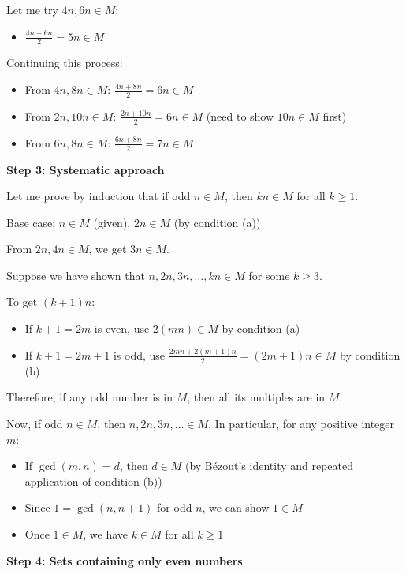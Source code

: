 \documentclass[12pt,a4paper]{article}
\theoremstyle{definition}
\begin{document}
    Let me try $4n, 6n \in M$:
    \begin{itemize}
        \item $\frac{4n + 6n}{2} = 5n \in M$
    \end{itemize}

    Continuing this process:
    \begin{itemize}
        \item From $4n, 8n \in M$: $\frac{4n + 8n}{2} = 6n \in M$
        \item From $2n, 10n \in M$: $\frac{2n + 10n}{2} = 6n \in M$ (need to show $10n \in M$ first)
        \item From $6n, 8n \in M$: $\frac{6n + 8n}{2} = 7n \in M$
    \end{itemize}

    \textbf{Step 3: Systematic approach}

    Let me prove by induction that if odd $n \in M$, then $kn \in M$ for all $k \geq 1$.

    Base case: $n \in M$ (given), $2n \in M$ (by condition (a))

    From $2n, 4n \in M$, we get $3n \in M$.

    Suppose we have shown that $n, 2n, 3n, \ldots, kn \in M$ for some $k \geq 3$.

    To get $(k+1)n$:
    \begin{itemize}
        \item If $k+1 = 2m$ is even, use $2(mn) \in M$ by condition (a)
        \item If $k+1 = 2m+1$ is odd, use $\frac{2mn + 2(m+1)n}{2} = (2m+1)n \in M$ by condition (b)
    \end{itemize}

    Therefore, if any odd number is in $M$, then all its multiples are in $M$.

    Now, if odd $n \in M$, then $n, 2n, 3n, \ldots \in M$. In particular, for any positive integer $m$:
    \begin{itemize}
        \item If $\gcd(m,n) = d$, then $d \in M$ (by Bézout's identity and repeated application of condition (b))
        \item Since $1 = \gcd(n,n+1)$ for odd $n$, we can show $1 \in M$
        \item Once $1 \in M$, we have $k \in M$ for all $k \geq 1$
    \end{itemize}

    \textbf{Step 4: Sets containing only even numbers}
\end{document}
